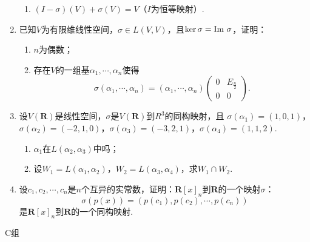 \begin{enumerate}
\begin{enumerate}[label=(\arabic*)]
        \item $(I-\sigma)(V)+\sigma(V)=V$（$I$为恒等映射）.
    \end{enumerate}
	\item 已知$V$为有限维线性空间，$\sigma\in L(V,V)$，且$\ker\sigma=\textup{Im }\sigma$，证明：
	\begin{enumerate}
        \item $n$为偶数；
        \item 存在$V$的一组基$\alpha_1,\cdots,\alpha_n$使得
        \[\sigma(\alpha_1,\cdots,\alpha_n)=(\alpha_1,\cdots,\alpha_n)\begin{pmatrix}
            0 & E_{\frac{n}{2}} \\ 0 & 0
        \end{pmatrix}.\]
    \end{enumerate}
    \item 设$V(\mathbf{R})$是线性空间，$\sigma$是$V(\mathbf{R})$到$R^3$的同构映射，且
	$\sigma(\alpha_1)=(1,0,1)$，$\sigma(\alpha_2)=(-2,1,0)$，$\sigma(\alpha_3)=(-3,2,1)$，$\sigma(\alpha_4)=(1,1,2)$.
    \begin{enumerate}[label=(\arabic*)]
        \item $\alpha_1$在$L(\alpha_2,\alpha_3)$中吗；
        \item 设$W_1=L(\alpha_1,\alpha_2)$，$W_2=L(\alpha_3,\alpha_4)$，求$W_1\cap W_2$.
    \end{enumerate}
	\item 设$c_1,c_2,\cdots,c_n$是$n$个互异的实常数，证明：$\mathbf{R}[x]_n$到$\mathbf{R}$的一个映射$\sigma$：
	\[\sigma(p(x))=(p(c_1),p(c_2),\cdots,p(c_n))\]
	是$\mathbf{R}[x]_n$到$\mathbf{R}$的一个同构映射.
\end{enumerate}
\centerline{\heiti C组}
